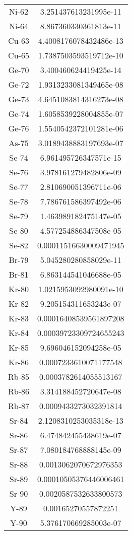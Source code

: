 \begin{table}[h!]
\begin{tabular}{|| c || c |}
Ni-62 & 3.251437613231995e-11 \\
Ni-64 & 8.867360330361813e-11 \\
Cu-63 & 4.4008176078432486e-13 \\
Cu-65 & 1.7387503593519712e-10 \\
Ge-70 & 3.400460624419425e-14 \\
Ge-72 & 1.9313233081349465e-08 \\
Ge-73 & 4.6451083814316273e-08 \\
Ge-74 & 1.6058539228004855e-07 \\
Ge-76 & 1.5540542372101281e-06 \\
As-75 & 3.0189438883197693e-07 \\
Se-74 & 6.961495726347571e-15 \\
Se-76 & 3.978161279482806e-09 \\
Se-77 & 2.810690051396711e-06 \\
Se-78 & 7.786761586397492e-06 \\
Se-79 & 1.463989182475147e-05 \\
Se-80 & 4.577254886347508e-05 \\
Se-82 & 0.00011516630009471945 \\
Br-79 & 5.045280280858029e-11 \\
Br-81 & 6.863144541046688e-05 \\
Kr-80 & 1.0215953092980091e-10 \\
Kr-82 & 9.205154311653243e-07 \\
Kr-83 & 0.00016408539561897208 \\
Kr-84 & 0.00039723309724655243 \\
Kr-85 & 9.696046152094258e-05 \\
Kr-86 & 0.0007233610071177548 \\
Rb-85 & 0.0003782614055513167 \\
Rb-86 & 3.314188452720647e-08 \\
Rb-87 & 0.0009433273032391814 \\
Sr-84 & 2.1208310253035318e-13 \\
Sr-86 & 6.474842455438619e-07 \\
Sr-87 & 7.080184768888145e-09 \\
Sr-88 & 0.0013062070672976353 \\
Sr-89 & 0.00010505376446006461 \\
Sr-90 & 0.0020587532633800573 \\
Y-89 & 0.00165270557872251 \\
Y-90 & 5.376170669285003e-07 \\

\end{tabular}
\end{table}

